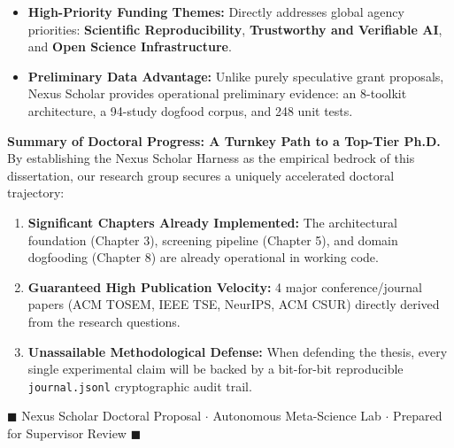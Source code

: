 \documentclass[10pt,a4paper]{article}
\newcommand{\inlinecode}[1]{\texttt{\small\color{tealDark}#1}}
\begin{document}
\vspace{-4pt}

\begin{itemize}
  \item \textbf{High-Priority Funding Themes:} Directly addresses global agency priorities: \textbf{Scientific Reproducibility}, \textbf{Trustworthy and Verifiable AI}, and \textbf{Open Science Infrastructure}.
  \item \textbf{Preliminary Data Advantage:} Unlike purely speculative grant proposals, Nexus Scholar provides operational preliminary evidence: an 8-toolkit architecture, a 94-study dogfood corpus, and 248 unit tests.
\end{itemize}

\vspace{-2pt}

\begin{tcolorbox}[
  enhanced,
  colback=slateBg,
  colframe=tealDark,
  boxrule=1pt,
  arc=4pt,
  boxsep=0pt,
  left=10pt, right=10pt, top=6pt, bottom=6pt
]
\textbf{\large\color{navyPrimary}Summary of Doctoral Progress: A Turnkey Path to a Top-Tier Ph.D.}\\[1pt]
\color{slateText}\small
By establishing the Nexus Scholar Harness as the empirical bedrock of this dissertation, our research group secures a uniquely accelerated doctoral trajectory:
\begin{enumerate}[leftmargin=14pt]
  \item \textbf{Significant Chapters Already Implemented:} The architectural foundation (Chapter 3), screening pipeline (Chapter 5), and domain dogfooding (Chapter 8) are already operational in working code.
  \item \textbf{Guaranteed High Publication Velocity:} 4 major conference/journal papers (ACM TOSEM, IEEE TSE, NeurIPS, ACM CSUR) directly derived from the research questions.
  \item \textbf{Unassailable Methodological Defense:} When defending the thesis, every single experimental claim will be backed by a bit-for-bit reproducible \inlinecode{journal.jsonl} cryptographic audit trail.
\end{enumerate}
\end{tcolorbox}

\vfill
\begin{center}
  \color{slateMuted}\footnotesize
  $\blacksquare$ Nexus Scholar Doctoral Proposal $\cdot$ Autonomous Meta-Science Lab $\cdot$ Prepared for Supervisor Review $\blacksquare$
\end{center}
\end{document}
